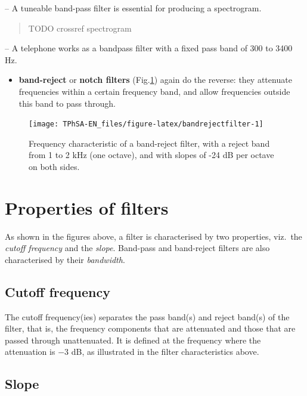 \documentclass[
]{book}
\providecommand{\tightlist}{%
  \setlength{\itemsep}{0pt}\setlength{\parskip}{0pt}}
\begin{document}
-- A tuneable band-pass filter is essential for producing a spectrogram.

\begin{quote}
TODO crossref spectrogram
\end{quote}

-- A telephone works as a bandpass filter with a fixed pass band of 300 to 3400 Hz.

\begin{itemize}
\tightlist
\item
  \textbf{band-reject} or \textbf{notch filters} (Fig.\ref{fig:bandrejectfilter}) again do the reverse: they attenuate frequencies within a certain frequency band, and allow frequencies outside this band to pass through.
\end{itemize}

\begin{figure}

{\centering \texttt{[image: TPhSA-EN\_files/figure-latex/bandrejectfilter-1]} 

}

\caption{Frequency characteristic of a band-reject filter, with a reject band from 1 to 2 kHz (one octave), and with slopes of -24 dB per octave on both sides.}\label{fig:bandrejectfilter}
\end{figure}

\section{Properties of filters}\label{properties-of-filters}

As shown in the figures above, a filter is characterised by two properties, viz.~the \emph{cutoff frequency} and the \emph{slope}. Band-pass and band-reject filters are also characterised by their \emph{bandwidth}.

\subsection{Cutoff frequency}\label{cutoff-frequency}

The cutoff frequency(ies) separates the pass band(s) and reject band(s) of the filter, that is, the frequency components that are attenuated and those that are passed through unattenuated. It is defined at the frequency where the attenuation is \(-3\) dB, as illustrated in the filter characteristics above.

\subsection{Slope}\label{slope}
\end{document}
